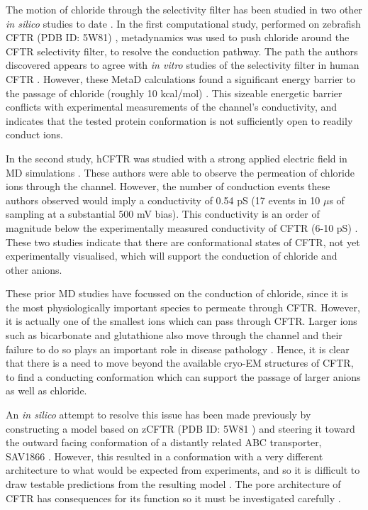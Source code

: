 The motion of chloride through the selectivity filter has been studied in two other \textit{in silico} studies to date \cite{farkas2020, zeng2021}. In the first computational study, performed on zebrafish CFTR (PDB ID: 5W81) \cite{zhang2017a}, metadynamics was used to push chloride around the CFTR selectivity filter, to resolve the conduction pathway. The path the authors discovered appears to agree with \textit{in vitro} studies of the selectivity filter in human CFTR \cite{linsdell2016}. However, these MetaD calculations found a significant energy barrier to the passage of chloride (roughly 10 kcal/mol) \cite{farkas2020}. This sizeable energetic barrier conflicts with experimental measurements of the channel's conductivity, and indicates that the tested protein conformation is not sufficiently open to readily conduct ions. 

In the second study, hCFTR was studied with a strong applied electric field in MD simulations \cite{zeng2021}. These authors were able to observe the permeation of chloride ions through the channel. However, the number of conduction events these authors observed would imply a conductivity of 0.54 pS (17 events in 10 $\mu$s of sampling at a substantial 500 mV bias). This conductivity is an order of magnitude below the experimentally measured conductivity of CFTR (6-10 pS) \cite{gong2004, lee2007, linsdell2001, sheppard1999}. These two studies indicate that there are conformational states of CFTR, not yet experimentally visualised, which will support the conduction of chloride and other anions. 

These prior MD studies have focussed on the conduction of chloride, since it is the most physiologically important species to permeate through CFTR. However, it is actually one of the smallest ions which can pass through CFTR. Larger ions such as bicarbonate and glutathione also move through the channel and their failure to do so plays an important role in disease pathology \cite{gao1999, kogan2003, linsdell1998, tang2009, larusch2014, jun2016}. Hence, it is clear that there is a need to move beyond the available cryo-EM structures of CFTR, to find a conducting conformation which can support the passage of larger anions as well as chloride. 

An \textit{in silico} attempt to resolve this issue has been made previously by constructing a model based on zCFTR (PDB ID: 5W81 \cite{zhang2017a}) and steering it toward the outward facing conformation of a distantly related ABC transporter, SAV1866 \cite{hoffmann2018, dawson2006}. However, this resulted in a conformation with a very different architecture to what would be expected from experiments, and so it is difficult to draw testable predictions from the resulting model \cite{hoffmann2018, linsdell2018}. The pore architecture of CFTR has consequences for its function so it must be investigated carefully \cite{linsdell2016, linsdell2018, cui2008}. 


